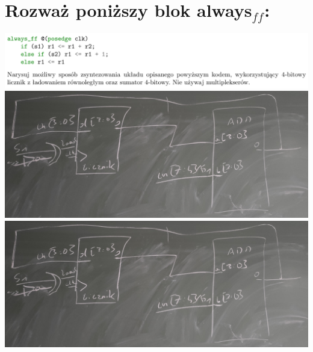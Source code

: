 \documentclass{article}
\begin{document}
\section{Rozważ poniższy blok always$_{ff}$:}
\begin{center}
	\includegraphics[scale=0.4]{./L08Z03.png}\\
	\includegraphics[scale=0.1]{./L08Z03.jpg}
	\includegraphics[scale=0.1]{./L08Z03.jpg}
\end{center}
\end{document}
